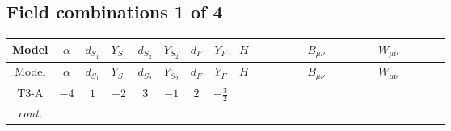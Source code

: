 \documentclass[8pt]{article}
\begin{document}
\begin{landscape}
\subsection*{Field combinations 1 of 4}
\begin{longtable}{@{}cccccccc >{\raggedright\arraybackslash}p{0.21\linewidth} >{\raggedright\arraybackslash}p{0.21\linewidth} >{\raggedright\arraybackslash}p{0.21\linewidth}@{}}
\toprule
Model & $\alpha$ & $d_{S_1}$ & $Y_{S_1}$ & $d_{S_2}$ & $Y_{S_2}$ & $d_F$ & $Y_F$ & $H$ & $B_{\mu\nu}$ & $W_{\mu\nu}$ \\
\midrule
\endfirsthead
\toprule
Model & $\alpha$ & $d_{S_1}$ & $Y_{S_1}$ & $d_{S_2}$ & $Y_{S_2}$ & $d_F$ & $Y_F$ & $H$ & $B_{\mu\nu}$ & $W_{\mu\nu}$ \\
\midrule
\endhead
T3-A & $-4$ & $1$ & $-2$ & $3$ & $-1$ & $2$ & $-\frac{3}{2}$ & \scriptsize\adjustbox{max width=\linewidth}{$\begin{gathered} +\text{CH21} H_{a_1} H_{a_1}{}^{\dagger } \\ -H_{a_1} \mu ^2 H_{a_1}{}^{\dagger } \\ +\frac{2 \hbar  \overline{\lambda_5} H_{a_1} H_{a_2} \lambda_5 H_{a_1}{}^{\dagger } H_{a_2}{}^{\dagger }}{\sqrt{3} \epsilon }\end{gathered}$} & \scriptsize\adjustbox{max width=\linewidth}{$\begin{gathered} -\frac{61 \hbar  B_{\mu _1\mu _2}^2}{12 \epsilon } \\ -\frac{1}{3} \hbar  \log \left(\frac{\bar{\mu}^{2}}{m_1^2}\right) B_{\mu _1\mu _2}^2 \\ -\frac{1}{4} \hbar  \log \left(\frac{\bar{\mu}^{2}}{m_2^2}\right) B_{\mu _1\mu _2}^2\end{gathered}$} & \scriptsize\adjustbox{max width=\linewidth}{$\begin{gathered} -\frac{2 \hbar  \left(W_{\mu _1\mu _2}^{A_1}\right){}^2}{3 \epsilon } \\ -\frac{1}{6} \hbar  \log \left(\frac{\bar{\mu}^{2}}{m_2^2}\right) \left(W_{\mu _1\mu _2}^{A_1}\right){}^2\end{gathered}$} \\
\textit{cont.} &  &  &  &  &  &  &  & \scriptsize\adjustbox{max width=\linewidth}{$\begin{gathered} +\frac{2 \hbar  \overline{\lambda_5} H_{a_1} H_{a_2} m_1^2 \lambda_5 H_{a_1}{}^{\dagger } H_{a_2}{}^{\dagger }}{\sqrt{3} \left(m_1^2-m_2^2\right)} \\ +\frac{2 \hbar  \log \left(\frac{\bar{\mu}^{2}}{m_1^2}\right) \overline{\lambda_5} H_{a_1} H_{a_2} m_1^2 \lambda_5 H_{a_1}{}^{\dagger } H_{a_2}{}^{\dagger }}{\sqrt{3} \left(m_1^2-m_2^2\right)} \\ -\frac{2 \hbar  \overline{\lambda_5} H_{a_1} H_{a_2} m_2^2 \lambda_5 H_{a_1}{}^{\dagger } H_{a_2}{}^{\dagger }}{\sqrt{3} \left(m_1^2-m_2^2\right)}\end{gathered}$} &  &  \\

\end{longtable}
\end{landscape}
\end{document}
